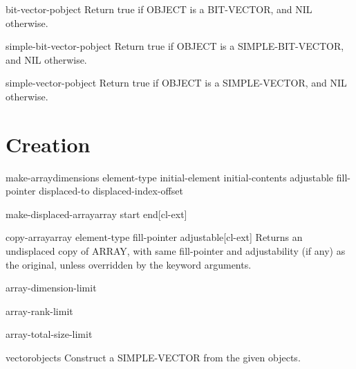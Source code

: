 \documentclass[10pt,english]{book}
\begin{document}
\begin{function}{bit-vector-p}{object}
  Return true if OBJECT is a BIT-VECTOR, and NIL otherwise.
\end{function}

\begin{function}{simple-bit-vector-p}{object}
  Return true if OBJECT is a SIMPLE-BIT-VECTOR, and NIL otherwise.
\end{function}

\begin{function}{simple-vector-p}{object}
  Return true if OBJECT is a SIMPLE-VECTOR, and NIL otherwise.
\end{function}

\section{Creation}
\label{sec:array-creation}

\begin{function}{make-array}{dimensions \key element-type initial-element initial-contents adjustable
 fill-pointer displaced-to displaced-index-offset}
  
\end{function}

\begin{function}{make-displaced-array}{array \op start end}[cl-ext]
  
\end{function}

\begin{function}{copy-array}{array \key element-type fill-pointer adjustable}[cl-ext]
  Returns an undisplaced copy of ARRAY, with same fill-pointer
and adjustability (if any) as the original, unless overridden by
the keyword arguments.
\end{function}

\begin{constant}{array-dimension-limit}{}
  
\end{constant}

\begin{constant}{array-rank-limit}{}
  
\end{constant}

\begin{constant}{array-total-size-limit}{}
  
\end{constant}

\begin{function}{vector}{\rest objects}
  Construct a SIMPLE-VECTOR from the given objects.
\end{function}
\end{document}
